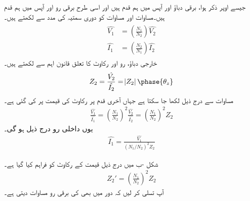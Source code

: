 جیسے اوپر ذکر ہوا، برقی دباؤ  اور  آپس میں ہم قدم ہیں اور  اسی طرح برقی رو  اور  آپس میں  ہم قدم ہیں۔مساوات  اور  مساوات    کو دوری سمتیہ کی مدد سے لکھتے ہیں۔
\begin{gather}
\begin{aligned}\label{مساوات_ٹرانسفارمر_دباو_رو_الف}
\hat{V_1}&=\left(\frac{N_1}{N_2} \right) \hat{V_2}\\
\hat{I_1}&=\left(\frac{N_2}{N_1} \right) \hat{I_2}
\end{aligned}
\end{gather}
خارجی دباؤ، رو اور رکاوٹ کا تعلق قانون اہم سے لکھتے ہیں۔
\begin{align}
Z_2=\frac{\hat{V_2}}{\hat{I_2}}=\abs{Z_2}\phase{\theta_z}
\end{align}
مساوات   سے درج ذیل لکھا جا سکتا ہے جہاں آخری قدم پر رکاوٹ کی قیمت پر کی گئی ہے۔
\begin{align}\label{مساوات_ٹرانسفارمر_تبادلہ_رکاوٹ_الف}
\frac{\hat{V_1}}{\hat{I_1}}=\left(\frac{N_1}{N_2} \right)^2 \frac{\hat{V_2}}{\hat{I_2}}=\left(\frac{N_1}{N_2} \right)^2  Z_2
\end{align}
یوں  داخلی رو درج ذیل ہو گی۔
\begin{align}\label{مساوات_ٹرانسفارمر_تبادلہ_رکاوٹ_ب}
\hat{I_1}=\frac{\hat{V_1}}{(N_1/N_2 )^2  Z_2}
\end{align}

شکل -ب میں  درج ذیل قیمت کے رکاوٹ  کو فراہم کیا گیا ہے۔ 
\begin{align}\label{مساوات_ٹرانسفارمر_متبادل_رکاوٹ_تعریف}
Z_2'=\left(\frac{N_1}{N_2} \right)^2  Z_2
\end{align}
آپ تسلی کر لیں کہ  دور میں بھی   کی برقی رو مساوات  دیتی ہے۔

